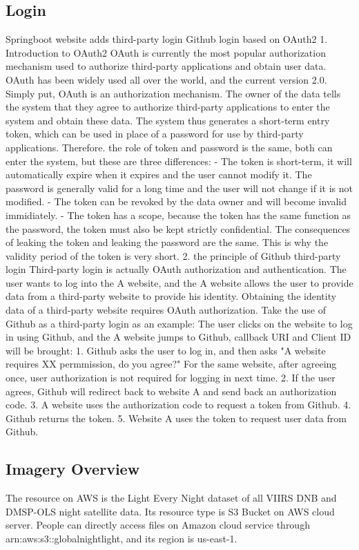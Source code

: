 \documentclass[conference]{IEEEtran}
\begin{document}
\subsection{Login}
Springboot website adds third-party login Github login based on OAuth2
1. Introduction to OAuth2
OAuth is currently the most popular authorization mechanism used to authorize third-party applications and
obtain user data. OAuth has been widely used all over the world, and the current version 2.0. Simply put,
OAuth is an authorization mechanism. The owner of the data tells the system that they agree to authorize
third-party applications to enter the system and obtain these data. The system thus generates a short-term
entry token, which can be used in place of a password for use by third-party applications. Therefore.
the role of token and password is the same, both can enter the system, but these are three differences:
- The token is short-term, it will automatically expire when it expires and the user cannot modify it.
The password is generally valid for a long time and the user will not change if it is not modified.
- The token can be revoked by the data owner and will become invalid immidiately.
- The token has a scope, because the token has the same function as the password, the token must
also be kept strictly confidential. The consequences of leaking the token and leaking the password are
the same. This is why the validity period of the token is very short.
2. the principle of Github third-party login
Third-party login is actually OAuth authorization and authentication. The user wants to log into the
A website, and the A website allows the user to provide data from a third-party website to provide his
identity. Obtaining the identity data of a third-party website requires OAuth authorization.
Take the use of Github as a third-party login as an example:
The user clicks on the website to log in using Github, and the A website jumps to Github, callback
URI and Client ID will be brought:
1. Github asks the user to log in, and then asks "A website requires XX permmission, do you agree?"
For the same website, after agreeing once, user authorization is not required for logging in next time.
2. If the user agrees, Github will redirect back to website A and send back an authorization code.
3. A website uses the authorization code to request a token from Github.
4. Github returns the token.
5. Website A uses the token to request user data from Github.

\subsection{Imagery Overview}
The resource on AWS is the Light Every Night dataset of all VIIRS DNB and DMSP-OLS night satellite data. Its resource type is S3 Bucket on AWS cloud server. People can directly access files on Amazon cloud service through arn:aws:s3::globalnightlight, and its region is us-east-1\cite{WorldBan13:online}.
\end{document}
